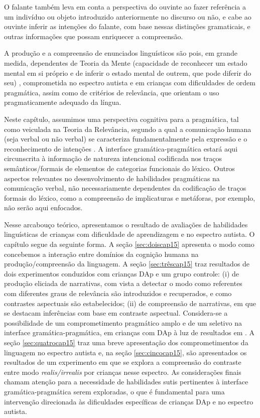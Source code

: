 \documentclass[output=paper,colorlinks,citecolor=brown,booklanguage=portuguese]{langscibook}
\begin{document}
O falante também leva em conta a perspectiva do ouvinte ao fazer referência a um indivíduo ou objeto introduzido anteriormente no discurso ou não, e cabe ao ouvinte inferir as intenções do falante, com base nessas distinções gramaticais, e outras informações que possam enriquecer a compreensão. 

A produção e a compreensão de enunciados linguísticos são pois, em grande medida, dependentes de Teoria da Mente (capacidade de reconhecer um estado mental em si próprio e de inferir o estado mental de outrem, que pode diferir do seu) \citep{BaronCohen2000, Premack1978}, comprometida no espectro autista e em crianças com dificuldades de ordem pragmática, assim como de critérios de relevância, que orientam o uso pragmaticamente adequado da língua. 

Neste capítulo, assumimos uma perspectiva cognitiva para a pragmática, tal como veiculada na Teoria da Relevância, segundo a qual a comunicação humana (seja verbal ou não verbal) se caracteriza fundamentalmente pela expressão e o reconhecimento de intenções \citep{Sperber2002}. A interface gramática-pragmática estará aqui circunscrita à informação de natureza intencional codificada nos traços semânticos/formais de elementos de categorias funcionais do léxico.  Outros aspectos relevantes no desenvolvimento de habilidades pragmáticas na comunicação verbal, não necessariamente dependentes da codificação de traços formais do léxico, como a compreensão de implicaturas e metáforas, por exemplo, não serão aqui enfocados.

Nesse arcabouço teórico, apresentamos o resultado de avaliações de habilidades linguísticas de crianças com dificuldade de aprendizagem e no espectro autista. O capítulo segue da seguinte forma. A seção \ref{sec:doiscap15} apresenta o modo como concebemos a interação entre domínios da cognição humana na produção/compreensão da linguagem. A seção \ref{sec:trêscap15} traz resultados de dois experimentos conduzidos com crianças DAp e um grupo controle: (i) de produção eliciada de narrativas, com vista a detectar o modo como referentes com diferentes graus de relevância são introduzidos e recuperados, e como contrastes aspectuais são estabelecidos; (ii) de compreensão de narrativas, em que se destacam inferências com base em contraste aspectual. Considera-se a possibilidade de um comprometimento pragmático amplo e de um seletivo na interface gramática-pragmática, em crianças com DAp à luz de resultados em \citet{Longchamps2014}. A seção \ref{sec:quatrocap15} traz uma breve apresentação dos comprometimentos da linguagem no espectro autista e, na seção \ref{sec:cincocap15}, são apresentados os resultados de um experimento em que se explora a compreensão do contraste entre modo \emph{realis/irrealis} por crianças nesse espectro. As considerações finais chamam atenção para a necessidade de habilidades sutis pertinentes à interface gramática-pragmática serem exploradas, o que é fundamental para uma intervenção direcionada às dificuldades específicas de crianças DAp e no espectro autista. 
\end{document}
